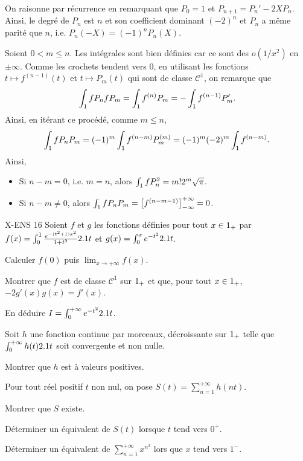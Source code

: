 \begin{solution}
\begin{reponses}
\item On raisonne par récurrence en remarquant que $P_0 = 1$ et $P_{n+1} = P_n' - 2 X P_n$. Ainsi, le degré de $P_n$ est $n$ et son coefficient dominant $(-2)^n$ et $P_n$ a même parité que $n$, i.e. $P_n(-X) = (-1)^n P_n(X)$.

\item Soient $0 < m \leq n$. Les intégrales sont bien définies car ce sont des $o(1/x^2)$ en $\pm\infty$. Comme les crochets tendent vers $0$, en utilisant les fonctions $t \mapsto f^{(n-1)}(t)$ et $t \mapsto P_m(t)$ qui sont de classe $\mathscr{C}^1$, on remarque que
\[
\int_1 f P_n f P_m = \int_1 f^{(n)} P_m = -\int_1 f^{(n-1)} P_m'.
\]
Ainsi, en itérant ce procédé, comme $m \leq n$,
\[
\int_1 f P_n P_m = (-1)^m \int_1 f^{(n-m)} P_m^{(m)}
= (-1)^m (-2)^m \int_1 f^{(n-m)}.
\]
Ainsi,
\begin{itemize}
\item Si $n - m = 0$, i.e. $m = n$, alors $\int_1 f P_n^2 = m! 2^m \sqrt{\pi}$.
\item Si $n - m \neq 0$, alors $\int_1 f P_n P_m = \left[f^{(n-m-1)}\right]_{-\infty}^{+\infty} = 0$.
\end{itemize}
\end{reponses}
\end{solution}





\begin{exercice}
{X-ENS}
{16}%
Soient $f$ et $g$ les fonctions définies pour tout $x \in 1_+$ par $f(x) = \int_0^1 \frac{e^{-(t^2+1) x^2}}{1 + t^2} 2.1 t$ et $g(x) = \int_0^x e^{-t^2} 2.1 t$.
\begin{questions}
\item Calculer $f(0)$ puis $\lim_{x\to+\infty} f(x)$.

\item Montrer que $f$ est de classe $\mathscr{C}^1$ sur $1_+$ et que, pour tout $x \in 1_+$, $-2 g'(x) g(x) = f'(x)$.

\item En déduire $I = \int_0^{+\infty} e^{-t^2} 2.1 t$.

Soit $h$ une fonction continue par morceaux, décroissante sur $1_+$ telle que $\int_0^{+\infty} h(t) 2.1 t$ soit convergente et non nulle.

\item Montrer que $h$ est à valeurs positives.

Pour tout réel positif $t$ non nul, on pose $S(t) = \sum_{n=1}^{+\infty} h(n t)$.
\item Montrer que $S$ existe.

\item Déterminer un équivalent de $S(t)$ lorsque $t$ tend vers $0^+$.

\item Déterminer un équivalent de $\sum_{n=1}^{+\infty} x^{n^2}$ lors que $x$ tend vers $1^-$.
\end{questions}
\end{exercice}

